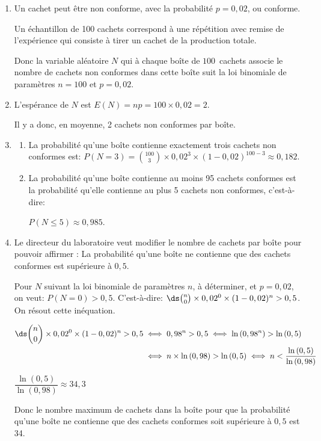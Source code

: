 \begin{enumerate}
	\item 
Un cachet peut être non conforme, avec la probabilité $p=0,02$, ou conforme.	
	
Un échantillon de 100 cachets correspond à une répétition avec remise de l'expérience qui consiste à tirer un cachet de la production totale.

Donc la variable aléatoire $N$ qui à chaque boîte de $100$~cachets associe le nombre de cachets non conformes dans cette boîte suit  la loi binomiale de paramètres $n=100$ et $p=0,02$.
	
	\item L'espérance de $N$ est $E(N)=np=100\times 0,02 =2$.
	
Il y a donc, en moyenne, 2 cachets non conformes par boîte.
	
	\item 
	\begin{enumerate}
		\item 
La probabilité qu'une boîte contienne exactement trois cachets non conformes est:
$P(N=3)= \binom{100}{3} \times 0,02^3 \times (1-0,02)^{100-3}\approx 0,182$.
		\item La probabilité qu'une boîte contienne au moins 95 cachets conformes est la probabilité qu'elle contienne  au plus 5 cachets non conformes, c'est-à-dire:

$P(N\leqslant 5)\approx 0,985$.
	\end{enumerate}
	\item Le directeur du laboratoire veut modifier le nombre de cachets par boîte pour pouvoir affirmer : \og La probabilité qu'une boîte ne contienne que des cachets conformes est supérieure à $0,5$\fg.
	


Pour $N$ suivant la loi binomiale de paramètres $n$, à déterminer, et $p=0,02$, on veut: $P(N=0) >0,5$. C'est-à-dire:
$\ds\binom{n}{0} \times 0,02^0 \times (1-0,02)^{n} > 0,5$.
On résout cette inéquation.

$\begin{aligned}
\ds\binom{n}{0} \times 0,02^0 \times (1-0,02)^{n} > 0,5
& \iff
0,98^n > 0,5
\iff
\ln \left (0,98^n \right ) > \ln\left (0,5\right )\\
& \iff
n \times \ln \left (0,98 \right ) > \ln\left (0,5\right )
\iff
n < \dfrac{\ln\left (0,5\right )}{\ln \left (0,98 \right )}
\end{aligned}$

$\dfrac{\ln\left (0,5\right )}{\ln \left (0,98 \right )}\approx 34,3$

Donc le nombre maximum de cachets dans la boîte pour que la  probabilité qu'une boîte ne contienne que des cachets conformes soit supérieure à $0,5$ est 34.
\end{enumerate}

